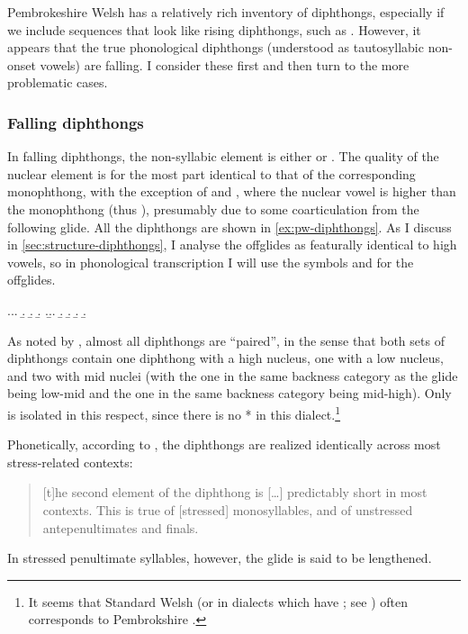 Pembrokeshire Welsh has a relatively rich inventory of diphthongs, especially if we include sequences that look like rising diphthongs, such as \ipa{[we]}. However, it appears that the true phonological diphthongs (understood as tautosyllabic non\hyp onset vowels) are falling. I consider these first and then turn to the more problematic cases.

\subsubsection{Falling diphthongs}
\label{sec:falling-diphthongs}

In falling diphthongs, the non-syllabic element is either \ipa{[i]} or \ipa{[u]}. The quality of the nuclear element is for the most part identical to that of the corresponding monophthong, with the exception of \ipa{[ei]} and \ipa{[ou]}, where the nuclear vowel is higher than the monophthong (thus ), presumably due to some coarticulation from the following glide. All the diphthongs are shown in \cref{ex:pw-diphthongs}. As I discuss in \cref{sec:structure-diphthongs}, I analyse the offglides as featurally identical to high vowels, so in phonological transcription I will use the symbols \ipa{[i]} and \ipa{[u]} for the offglides.

\ex.\label{ex:pw-diphthongs}\a.\a.
\b.
\b.
\b.
\z.\b.\a.
\b.
\b.
\b.
\b.

As noted by \citet[p.~15]{awbery86:_pembr_welsh}, almost all diphthongs are \enquote{paired}, in the sense that both sets of diphthongs contain one diphthong with a high nucleus, one with a low nucleus, and two with mid nuclei (with the one in the same backness category as the glide being low-mid and the one in the same backness category being mid-high). Only \ipa{[əu]} is isolated in this respect, since there is no *\ipa{[əi]} in this dialect.\footnote{It seems that Standard Welsh \ipa{[əi]} (or \ipa{[əɨ]} in dialects which have \ipa{[ɨ]}; see \citealt[p.~727]{gyg}) often corresponds to Pembrokshire .}

Phonetically, according to \citet[p.~16]{awbery86:_pembr_welsh}, the diphthongs are realized identically across most stress-related contexts: \blockquote{[t]he second element of the diphthong is [\ldots] predictably short in most contexts. This is true of [stressed] monosyllables, and of unstressed antepenultimates and finals.} In stressed penultimate syllables, however, the glide is said to be lengthened.

